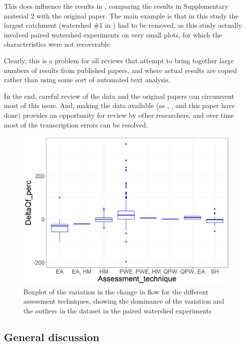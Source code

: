 \documentclass[]{elsarticle} %
\begin{document}
This does influence the results in \citet{zhang2017}, comparing the results in Supplementary material 2 with the original paper. The main example is that in this study the largest catchment (watershed \#1 in \citet{zhang2017}) had to be removed, as this study actually involved paired watershed experiments on very small plots, for which the characteristics were not recoverable.

Clearly, this is a problem for all reviews that attempt to bring together large numbers of results from published papers, and where actual results are copied rather than using some sort of automated text analysis.

In the end, careful review of the data and the original papers can circumvent most of this issue. And, making the data available (as \citet{zhang2017}, \citet{zhou2015}, \citet{filoso2017} and this paper have done) provides an opportunity for review by other researchers, and over time most of the transcription errors can be resolved.

\begin{figure}
\includegraphics[width=0.9\linewidth]{AssessmentTechnique_byDeltaQf} \caption{Boxplot of the variation in the change in flow for the different assessment techniques, showing the dominance of the variation and the outliers in the dataset in the paired watershed experiments}\label{fig:assessment}
\end{figure}

\hypertarget{general-discussion}{%
\subsection{General discussion}\label{general-discussion}}
\end{document}
